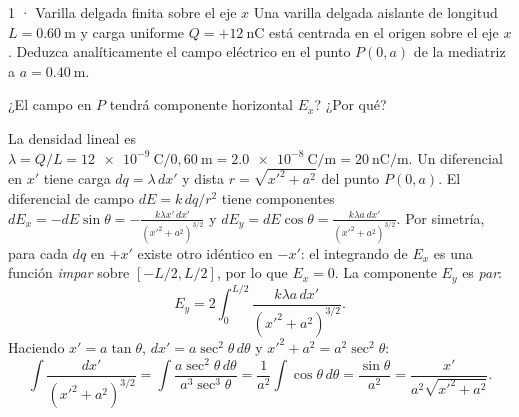 \documentclass[11pt]{article}
\begin{document}
\begin{eResuelto}{1 · Varilla delgada finita sobre el eje $x$}
Una varilla delgada aislante de longitud $L=\SI{0,60}{\metre}$ y carga uniforme $Q=+\SI{12}{\nano\coulomb}$ está centrada en el origen sobre el eje $x$. Deduzca analíticamente el campo eléctrico en el punto $P(0,a)$ de la mediatriz a $a=\SI{0,40}{\metre}$.
\begin{center}
\end{center}
\begin{ePredice}¿El campo en $P$ tendrá componente horizontal $E_x$? ¿Por qué?\end{ePredice}
La densidad lineal es $\lambda=Q/L=\SI{12e-9}{\coulomb}/0{,}60\ \mathrm{m}=\SI{2,0e-8}{\coulomb\per\metre}=\SI{20}{\nano\coulomb\per\metre}$.
Un diferencial en $x'$ tiene carga $dq=\lambda\,dx'$ y dista $r=\sqrt{x'^2+a^2}$ del punto $P(0,a)$.
El diferencial de campo $dE=k\,dq/r^2$ tiene componentes $dE_x=-dE\sin\theta = -\frac{k\lambda x'\,dx'}{(x'^2+a^2)^{3/2}}$ y $dE_y=dE\cos\theta = \frac{k\lambda a\,dx'}{(x'^2+a^2)^{3/2}}$.
Por simetría, para cada $dq$ en $+x'$ existe otro idéntico en $-x'$: el integrando de $E_x$ es una función \emph{impar} sobre $[-L/2,L/2]$, por lo que $E_x=0$. La componente $E_y$ es \emph{par}:
\[ E_y = 2\int_{0}^{L/2} \frac{k\lambda a\,dx'}{(x'^2+a^2)^{3/2}}. \]
Haciendo $x'=a\tan\theta$, $dx'=a\sec^2\theta\,d\theta$ y $x'^2+a^2=a^2\sec^2\theta$:
\[ \int \frac{dx'}{(x'^2+a^2)^{3/2}} = \int \frac{a\sec^2\theta\,d\theta}{a^3\sec^3\theta} = \frac{1}{a^2}\int\cos\theta\,d\theta = \frac{\sin\theta}{a^2} = \frac{x'}{a^2\sqrt{x'^2+a^2}}. \]

\end{eResuelto}
\end{document}

